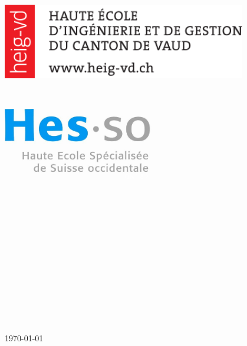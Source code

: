 \begin{titlepage}

\begin{minipage}{0.4\textwidth}
\begin{flushleft}
\includegraphics[width=0.8\textwidth]{pageGarde/logo1}~
\end{flushleft}
\end{minipage} 
~
\begin{minipage}{0.4\textwidth}
\begin{flushright}
\includegraphics[width=0.5\textwidth]{pageGarde/logo2}~
\end{flushright}
\end{minipage}\\[3cm]

\begin{center}

\textsc{\Large\theMatter} \\[0.2cm]
{\large\theAcro} \\[1cm]
\HRule \\[0.5cm]
\textsc{\huge \thetitle} \\[0.3cm]
\HRule \\[1cm]
{\large\theauthor} \\[2cm]
\end{center}

\begin{minipage}{0.4\textwidth}
\begin{flushleft}
\theInstitution
\end{flushleft}
\end{minipage}
~
\begin{minipage}{0.4\textwidth}
\begin{flushright}
\theDest
\end{flushright}
\end{minipage} \\[3cm]

\begin{center}
\today
\vfill
\end{center}

\end{titlepage}
